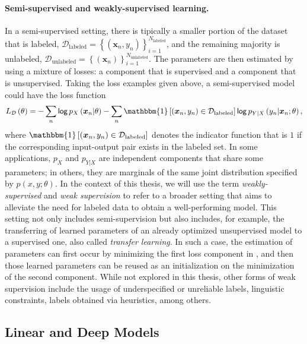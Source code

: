 \paragraph*{Semi-supervised and weakly-supervised learning.} In a
semi-supervised setting, there is tipically a smaller portion of the
dataset that is labeled,
$\mathcal{D}_{\text{labeled}}=
    \left\{(\bm{x}_n,y_n)\right\}_{i=1}^{N_{\text{labeled}}}$,
and the remaining majority is unlabeled,
$\mathcal{D}_{\text{unlabeled}}=
    \left\{(\bm{x}_n)\right\}_{i=1}^{N_{\text{unlabeled}}}$.
The parameters are then estimated by using a mixture of losses: a
component that is supervised and a component that is unsupervised.
Taking the loss examples given above, a semi-supervised model could
have the loss function
%
\begin{equation}
    L_{\mathcal D}\left(\theta\right)=
    -\sum_n\log p_{X}\left(\bm{x}_n|\theta\right)
    -\sum_n\mathbbm{1}\left[(\bm{x}_n,y_n)\in\mathcal{D}_{\text{labeled}}\right]
    \log p_{Y|X}\left(y_n|\bm{x}_n;\theta\right),
    \label{eq:semisup}
\end{equation}
%
where
$\mathbbm{1}\left[(\bm{x}_n,y_n)\in\mathcal{D}_{\text{labeled}}\right]$
denotes the indicator function that is $1$ if the corresponding
input-output pair exists in the labeled set. In some applications,
$p_X$ and $p_{Y|X}$ are independent components that share some
parameters; in others, they are marginals of the same joint
distribution specified by $p(x, y;\theta)$. In the context of this
thesis, we will use the term \textit{weakly-supervised} and
\textit{weak supervision} to refer to a broader setting that aims to
alleviate the need for labeled data to obtain a well-performing
model. This setting not only includes semi-supervision but also
includes, for example, the transferring of learned parameters of an
already optimized unsupervised model to a supervised one, also called
\textit{transfer learning}. In such a case, the estimation of
parameters can first occur by minimizing the first loss component in
, and then those learned parameters can be reused
as an initialization on the minimization of the second component.
While not explored in this thesis, other forms of weak supervision
include the usage of underspecified or unreliable labels, linguistic
constraints, labels obtained via heuristics, among others.

\subsection{Linear and Deep Models}

